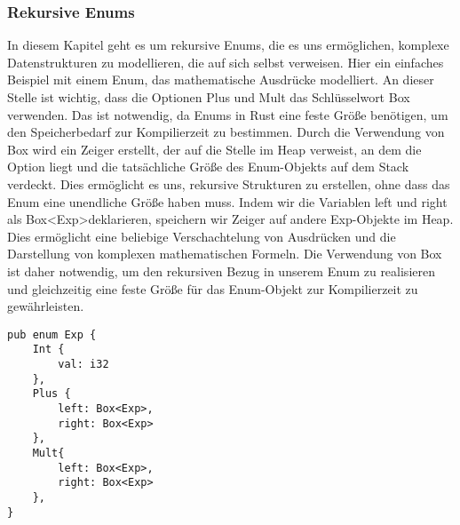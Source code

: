 \documentclass[a4paper, 1ppt]{article}
\begin{document}
\subsubsection{Rekursive Enums}
In diesem Kapitel geht es um rekursive Enums, die es uns ermöglichen, komplexe Datenstrukturen zu modellieren, die auf sich selbst verweisen. 
Hier ein einfaches Beispiel mit einem Enum, das mathematische Ausdrücke modelliert.
An dieser Stelle ist wichtig, dass die Optionen Plus und Mult das Schlüsselwort Box verwenden. Das ist notwendig, da Enums in Rust eine feste Größe benötigen, um den Speicherbedarf zur Kompilierzeit zu bestimmen. Durch die Verwendung von Box wird ein Zeiger erstellt, der auf die Stelle im Heap verweist, an dem die Option liegt und die tatsächliche Größe des Enum-Objekts auf dem Stack verdeckt. Dies ermöglicht es uns, rekursive Strukturen zu erstellen, ohne dass das Enum eine unendliche Größe haben muss.
Indem wir die Variablen left und right als Box\textless Exp\textgreater deklarieren, speichern wir Zeiger auf andere Exp-Objekte im Heap. Dies ermöglicht eine beliebige Verschachtelung von Ausdrücken und die Darstellung von komplexen mathematischen Formeln.
Die Verwendung von Box ist daher notwendig, um den rekursiven Bezug in unserem Enum zu realisieren und gleichzeitig eine feste Größe für das Enum-Objekt zur Kompilierzeit zu gewährleisten. 
\newpage
\begin{verbatim}
pub enum Exp {
    Int {
        val: i32
    },
    Plus {
        left: Box<Exp>,
        right: Box<Exp>
    },
    Mult{
        left: Box<Exp>,
        right: Box<Exp>
    },
}
\end{verbatim}
\end{document}
